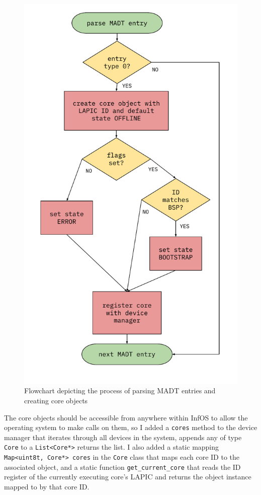 \documentclass[bsc,frontabs,singlespacing,parskip,deptreport]{infthesis}
\begin{document}
\begin{figure}[h]
    \centering
    \includegraphics[scale=0.6]{figures/state-flowchart.pdf}
    \caption{Flowchart depicting the process of parsing MADT entries and creating core objects}
    \label{state-flowchart}
\end{figure}

 The core objects should be accessible from anywhere within InfOS to allow the operating system to make calls on them, so I added a \verb|cores| method to the device manager that iterates through all devices in the system, appends any of type \verb|Core| to a \verb|List<Core*>| returns the list. I also added a static mapping \texttt{Map<uint8t, Core*> cores} in the \verb|Core| class that maps each core ID to the associated object, and a static function \verb|get_current_core| that reads the ID register of the currently executing core's LAPIC and returns the object instance mapped to by that core ID.
\end{document}
